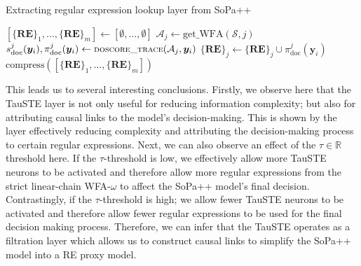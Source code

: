 \begin{algorithm}[t!]
  \small
  \caption{Extracting regular expression lookup layer from SoPa++}
  \label{algo:simplification_process}
  \begin{algorithmic}[1]
    \Statex
    \State $[\{\textbf{RE}\}_1, \ldots, \{\textbf{RE}\}_m] \gets [\emptyset,
    \ldots, \emptyset]$
    \State $\mathcal{A}_j \gets \text{get\_WFA}(\mathcal{S}, j)$
    \State $s^j_{\text{doc}}(\bm{y}_i), \pi^j_{\text{doc}}(\bm{y}_i) \gets
    {\small\textsc{doscore\_trace}}(\mathcal{A}_j, \bm{y}_i)$
    \State $\{\textbf{RE}\}_j \gets \{\textbf{RE}\}_j \cup
    \pi^j_{\text{doc}}(\bm{y}_i)$
    \EndIf
    \EndFor
    \EndFor
    \State \Return $\text{compress}([\{\textbf{RE}\}_1, \ldots, \{\textbf{RE}\}_m])$
    \EndFunction
  \end{algorithmic}
\end{algorithm}

This leads us to several interesting conclusions. Firstly, we observe here that
the TauSTE layer is not only useful for reducing information complexity; but
also for attributing causal links to the model's decision-making. This is shown
by the layer effectively reducing complexity and attributing the decision-making
process to certain regular expressions. Next, we can also observe an effect of
the $\tau \in \mathbb{R}$ threshold here. If the $\tau$-threshold is low, we
effectively allow more TauSTE neurons to be activated and therefore allow more
regular expressions from the strict linear-chain WFA-$\omega$ to affect the
SoPa++ model's final decision. Contrastingly, if the $\tau$-threshold is high;
we allow fewer TauSTE neurons to be activated and therefore allow fewer regular
expressions to be used for the final decision making process. Therefore, we can
infer that the TauSTE operates as a filtration layer which allows us to
construct causal links to simplify the SoPa++ model into a RE proxy model.

